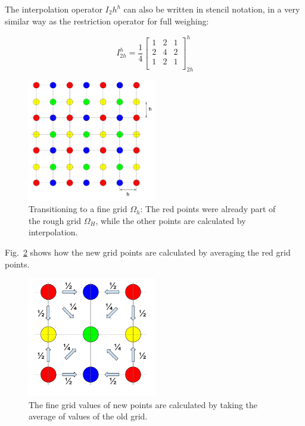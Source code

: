 The interpolation operator $I_2h^h$ can also be written in stencil notation, in a very similar way as the restriction operator for full weighing:

\begin{equation}
I_{2h}^h = \frac{1}{4} \begin{bmatrix}
1 & 2 & 1\\
2 & 4 & 2\\
1 & 2 & 1\\
\end{bmatrix}_{2h}^{h} 
\end{equation}

\begin{figure}[h]
	\centering
	\includegraphics[width=0.5\textwidth]{chapters/chapter02/mg_prolongation_grid}
	\caption{Transitioning to a fine grid $\Omega_h$: The red points were already part of the rough grid $\Omega_H$, while the other points are calculated by interpolation.}
	\label{fig:mg_prolongation_grid}
\end{figure}

Fig.~\ref{fig:mg_prolongation} shows how the new grid points are calculated by averaging the red grid points.

\begin{figure}[h]
	\centering
	\includegraphics[width=0.5\textwidth]{chapters/chapter02/mg_prolongation}
	\caption{The fine grid values of new points are calculated by taking the average of values of the old grid.}
	\label{fig:mg_prolongation}
\end{figure}


